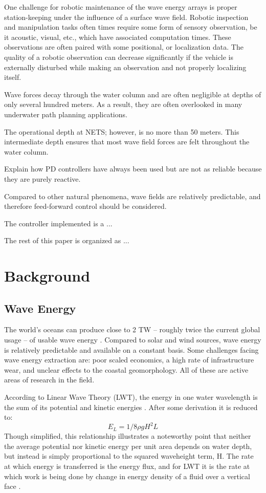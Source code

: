 \documentclass[double,12pt]{beavtex}
\begin{document}
One challenge for robotic maintenance of the wave energy arrays is proper station-keeping under the influence of a surface wave field. Robotic inspection and manipulation tasks often times require some form of sensory observation, be it acoustic, visual, etc., which  have associated computation times. These observations are often paired with some positional, or localization data. The quality of a robotic observation can decrease significantly if the vehicle is externally disturbed while making an observation and not properly localizing itself.

Wave forces decay through the water column and are often  negligible at depths of only several hundred meters. As a result, they are often overlooked in many underwater path planning applications. 

The operational depth at NETS; however, is no more than 50 meters. This intermediate depth ensures that most wave field forces are felt throughout the water column.

Explain how PD controllers have always been used but are not as reliable because they are purely reactive.

Compared to other natural phenomena, wave fields are relatively predictable, and therefore feed-forward control should be considered.

The controller implemented is a ...

The rest of this paper is organized as ...

\chapter{Background}

\section{Wave Energy}

The world's oceans can produce close to 2 TW -- roughly twice the current global usage -- of usable wave energy \cite{falnes}. Compared to solar and wind sources, wave energy is relatively predictable and available on a constant basis. Some challenges facing wave energy extraction are: poor scaled economics, a high rate of infrastructure wear, and unclear effects to the coastal geomorphology. All of these are active areas of research in the field.

According to Linear Wave Theory (LWT), the energy in one water wavelength is the sum of its potential and kinetic energies \cite{D&D}. After some derivation it is reduced to: 
\begin{equation}
E_L = 1/8 \rho g H^2 L
\end{equation}
Though simplified, this relationship illustrates a noteworthy point that neither the average potential nor kinetic energy per unit area depends on water depth, but instead is simply proportional to the squared waveheight term, H. The rate at which energy is transferred is the energy flux, and for LWT it is the rate at which work is being done by change in energy density of a fluid over a vertical face \cite{D&D}.
\end{document}
